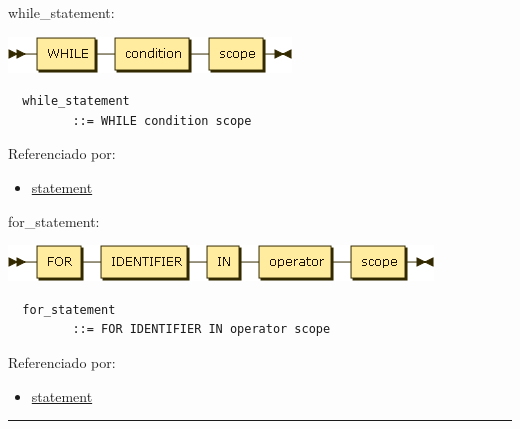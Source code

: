 \begin{minipage}{\textwidth}
  \protect\hypertarget{while_statement}{}{while\_statement:}

  \includegraphics[width=2.95833in,height=0.37500in]{diagram/while_statement.png}

  \begin{verbatim}
  while_statement
         ::= WHILE condition scope
  \end{verbatim}

  Referenciado por:

  \begin{itemize}
      \tightlist%
    \item
      \protect\hyperlink{statement}{statement}
  \end{itemize}

\end{minipage}

\begin{minipage}{\textwidth}
  \protect\hypertarget{for_statement}{}{for\_statement:}

  \includegraphics[width=4.43750in,height=0.37500in]{diagram/for_statement.png}

  \begin{verbatim}
  for_statement
         ::= FOR IDENTIFIER IN operator scope
  \end{verbatim}

  Referenciado por:

  \begin{itemize}
      \tightlist%
    \item
      \protect\hyperlink{statement}{statement}
  \end{itemize}

\end{minipage}

\begin{center}\rule{0.5\linewidth}{\linethickness}\end{center}
